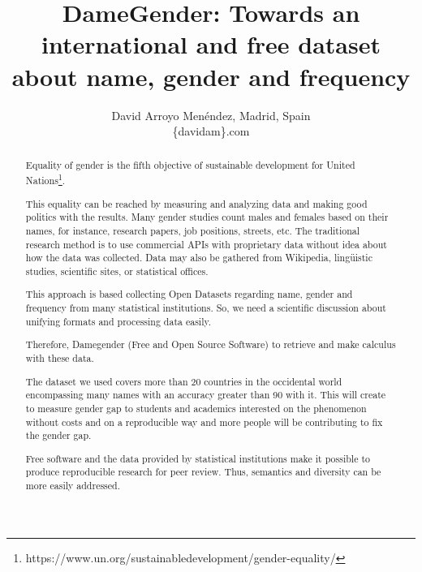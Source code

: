 \documentclass[a4paper]{article}
\title{DameGender: Towards an international and free dataset about name, gender and frequency}
\author{
David Arroyo Menéndez, Madrid, Spain \\ \{davidam\@gmail\}.com
}
\begin{document}
\maketitle

\begin{abstract}

  Equality of gender is the fifth objective of sustainable development
  for United
  Nations\footnote{https://www.un.org/sustainabledevelopment/gender-equality/}.

  This equality can be reached by measuring and analyzing data
  and making good politics with the results. Many gender studies
  count males and females based on their names, for
  instance, research papers, job positions, streets, etc. The
  traditional research method is to use commercial APIs with
  proprietary data without idea about how the data was collected.
  Data may also be gathered from Wikipedia, lingüistic studies,
  scientific sites, or statistical offices.


  This approach is based collecting Open Datasets regarding name,
  gender and frequency from many statistical institutions. So, we
  need a scientific discussion about unifying formats and processing
  data easily.

  Therefore, Damegender (Free and Open Source Software) to retrieve
  and make calculus with these data.


  The dataset we used covers more than 20 countries in the occidental
  world encompassing many names with an accuracy greater than 90%
  with it. This will create to measure gender gap to students and
  academics interested on the phenomenon without costs and on a
  reproducible way and more people will be contributing to fix the
  gender gap.


  Free software and the data provided by statistical institutions make
  it possible to produce reproducible research for peer review. Thus,
  semantics and diversity can be more easily addressed.
  
\end{abstract}
\end{document}
